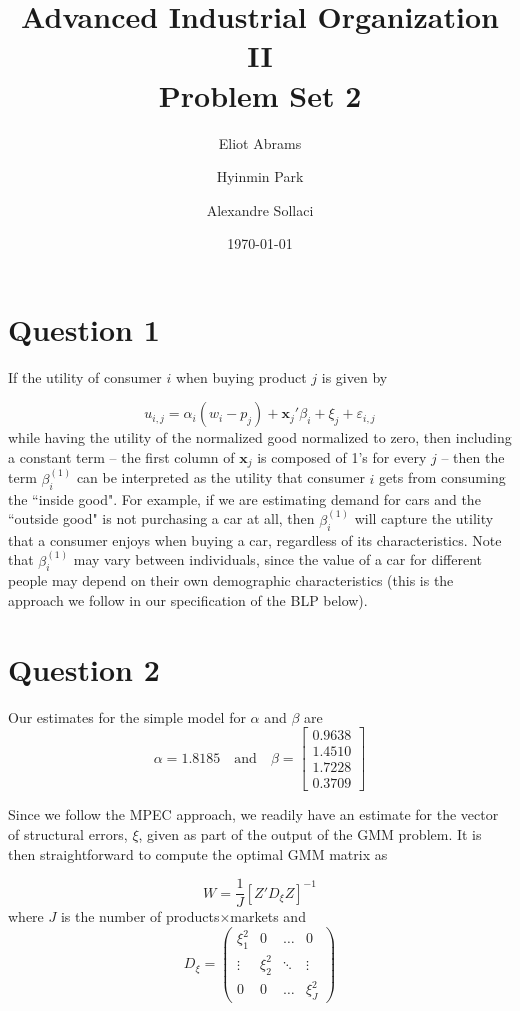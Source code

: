 \documentclass[a4paper,11pt]{article}
\begin{document}
\title{Advanced Industrial Organization II \\ Problem Set 2}
\author{Eliot Abrams \and Hyinmin Park \and Alexandre Sollaci}
\date{\today}
\maketitle

\section*{Question 1}

If the utility of consumer $i$ when buying product $j$ is given by

\[ u_{i,j} = \alpha_i(w_i - p_j) + \mathbf{x}_j'\beta_i + \xi_j + \varepsilon_{i,j} \]
while having the utility of the normalized good normalized to zero, then including a constant term -- the first column of $\mathbf{x}_j$ is composed of 1's for every $j$ -- then the term $\beta_i^{(1)}$ can be interpreted as the utility that consumer $i$ gets from consuming the ``inside good". For example, if we are estimating demand for cars and the ``outside good" is not purchasing a car at all, then $\beta_i^{(1)}$ will capture the utility that a consumer enjoys when buying a car, regardless of its characteristics. Note that $\beta_i^{(1)}$ may vary between individuals, since the value of a car for different people may depend on their own demographic characteristics (this is the approach we follow in our specification of the BLP below). 

\section*{Question 2}

Our estimates for the simple model for $\alpha$ and $\beta$ are
\[
\alpha = 1.8185 \quad \mbox{and}  \quad
\beta = \left[\begin{array}{l} 0.9638 \\ 1.4510 \\ 1.7228 \\ 0.3709 \end{array}\right] \]

Since we follow the MPEC approach, we readily have an estimate for the vector of structural errors, $\xi$, given as part of the output of the GMM problem. It is then straightforward to compute the optimal GMM matrix as

\[ W = \frac{1}{J}\left[Z'D_{\xi}Z\right]^{-1} \]where $J$ is the number of products$\times$markets and 
\[ D_{\xi} = \left(\begin{array}{cccc}
\xi_1^2 & 0 & \ldots & 0 \\
\vdots & \xi_2^2 & \ddots & \vdots \\
0 & 0 & \ldots & \xi_J^2
\end{array} \right) \]
\end{document}
